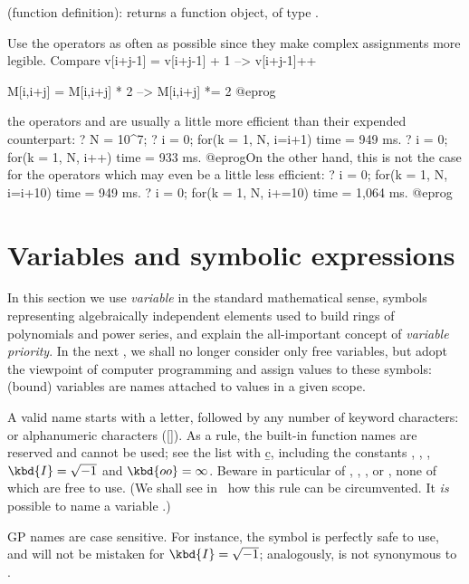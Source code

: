 \kbd{->} (function definition):  returns a
function object, of type .

 Use the \kbd{=} operators as often as possible
since they make complex assignments more legible. Compare
\bprog
v[i+j-1] = v[i+j-1] + 1    -->    v[i+j-1]++

M[i,i+j] = M[i,i+j] * 2    -->    M[i,i+j] *= 2
@eprog

 the operators \kbd{++}
and \kbd{--} are usually a little more efficient than their expended
counterpart:
\bprog
? N = 10^7;
? i = 0; for(k = 1, N, i=i+1)
time = 949 ms.
? i = 0; for(k = 1, N, i++)
time = 933 ms.
@eprog\noindent On the other hand, this is not the case for the
\kbd{=} operators which may even be a little less efficient:
\bprog
? i = 0; for(k = 1, N, i=i+10)
time = 949 ms.
? i = 0; for(k = 1, N, i+=10)
time = 1,064 ms.
@eprog

\section{Variables and symbolic expressions}\label{se:varsymb}
In this section we use \emph{variable} in the standard mathematical
sense, symbols representing algebraically independent elements used to build
rings of polynomials and power series, and explain the all-important concept
of \emph{variable priority}. In the next , we shall no
longer consider only free variables, but adopt the viewpoint of computer
programming and assign values to these symbols: (bound) variables are names
attached to values in a given scope.

\label{se:varname} A valid name starts with a letter,
followed by any number of keyword characters: \kbd{\_} or alphanumeric
characters ([]). As a rule, the built-in function names are
reserved and cannot be used; see the list with \b{c}, including the constants
, , , $\kbd{I}=\sqrt{-1}$ and $\kbd{oo} =
\infty$. Beware in particular of , , ,
 or , none of which are free to use. (We shall see
in~ how this rule can be circumvented. It \emph{is} possible
to name a  variable .)

GP names are case sensitive. For instance, the symbol  is perfectly
safe to use, and will not be mistaken for $\kbd{I} = \sqrt{-1}$; analogously,
 is not synonymous to .

